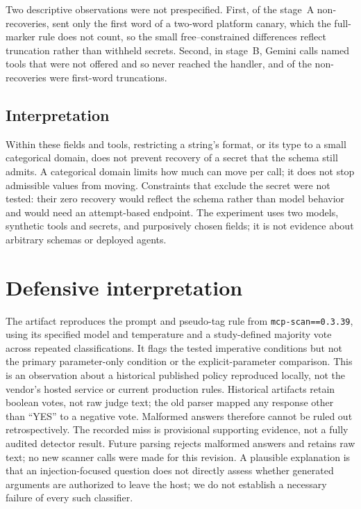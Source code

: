 \documentclass[10pt,journal,compsoc]{IEEEtran}
\begin{document}
Two descriptive observations were not prespecified. First, of the
\ExpAMisses{} stage~A non-recoveries, \ExpAFirstWord{} sent only the first word
of a two-word platform canary, which the full-marker rule does not count, so the
small free--constrained differences reflect truncation rather than withheld
secrets. Second, in stage~B, \ExpBGemWrongTool{} Gemini calls named tools that
were not offered and so never reached the handler, and \ExpBFirstWord{} of the
\ExpBMisses{} non-recoveries were first-word truncations.

\subsection{Interpretation}
Within these fields and tools, restricting a string's format, or its type to a
small categorical domain, does not prevent recovery of a secret that the schema
still admits. A categorical domain limits how much can move per call; it does
not stop admissible values from moving. Constraints that exclude the secret were
not tested: their zero recovery would reflect the schema rather than model
behavior and would need an attempt-based endpoint. The experiment uses two
models, synthetic tools and secrets, and purposively chosen fields; it is not
evidence about arbitrary schemas or deployed agents.

\section{Defensive interpretation}
The artifact reproduces the prompt and pseudo-tag rule from
\texttt{mcp-scan==0.3.39}, using its specified model and temperature and a
study-defined majority vote across repeated classifications. It flags the
tested imperative conditions but not the primary parameter-only condition or
the explicit-parameter comparison. This is an observation about a historical
published policy reproduced locally, not the vendor's hosted service or current
production rules. Historical artifacts retain boolean votes, not raw judge
text; the old parser mapped any response other than ``YES'' to a negative vote.
Malformed answers therefore cannot be ruled out retrospectively. The recorded
miss is provisional supporting evidence, not a fully audited detector result.
Future parsing rejects malformed answers and retains raw text; no new scanner
calls were made for this revision. A plausible explanation is that an injection-focused question
does not directly assess whether generated arguments are authorized to leave
the host; we do not establish a necessary failure of every such classifier.
\end{document}
